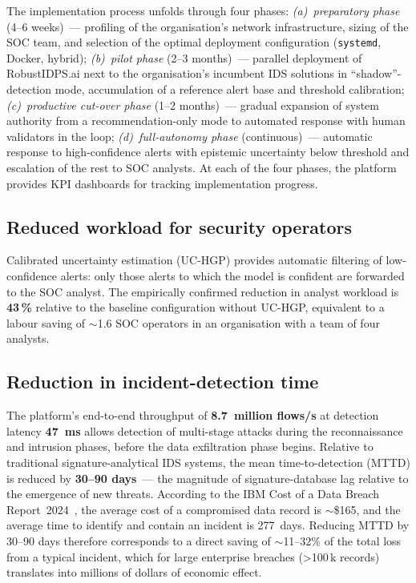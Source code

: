 The implementation process unfolds through four phases:
\emph{(a)~preparatory phase} (4--6 weeks)~--- profiling of the
organisation's network infrastructure, sizing of the SOC team,
and selection of the optimal deployment configuration
(\texttt{systemd}, Docker, hybrid); \emph{(b)~pilot phase}
(2--3 months)~--- parallel deployment of \textsf{RobustIDPS.ai}
next to the organisation's incumbent IDS solutions in
``shadow''-detection mode, accumulation of a reference alert base
and threshold calibration; \emph{(c)~productive cut-over phase}
(1--2 months)~--- gradual expansion of system authority from a
recommendation-only mode to automated response with human
validators in the loop; \emph{(d)~full-autonomy phase}
(continuous)~--- automatic response to high-confidence alerts with
epistemic uncertainty below threshold and escalation of the rest
to SOC analysts. At each of the four phases, the platform
provides KPI dashboards for tracking implementation progress.

\subsection{Reduced workload for security operators}

Calibrated uncertainty estimation (UC-HGP) provides automatic filtering
of low-confidence alerts: only those alerts to which the model is
confident are forwarded to the SOC analyst. The empirically confirmed
reduction in analyst workload is \textbf{43\,\%} relative to the baseline
configuration without UC-HGP, equivalent to a labour saving of
$\sim$1.6 SOC operators in an organisation with a team of four analysts.

\subsection{Reduction in incident-detection time}

The platform's end-to-end throughput of \textbf{8.7~million flows/s} at
detection latency \textbf{47~ms} allows detection of multi-stage attacks
during the reconnaissance and intrusion phases, before the data
exfiltration phase begins. Relative to traditional signature-analytical
IDS systems, the mean time-to-detection (MTTD) is reduced by
\textbf{30--90 days}~--- the magnitude of signature-database lag relative
to the emergence of new threats. According to the IBM Cost of a
Data Breach Report~2024~\cite{IBM2024}, the average cost of a
compromised data record is $\sim$\$165, and the average time to
identify and contain an incident is 277~days. Reducing MTTD by
30--90 days therefore corresponds to a direct saving of
$\sim$11--32\% of the total loss from a typical incident, which
for large enterprise breaches (>100\,k records) translates into
millions of dollars of economic effect.

